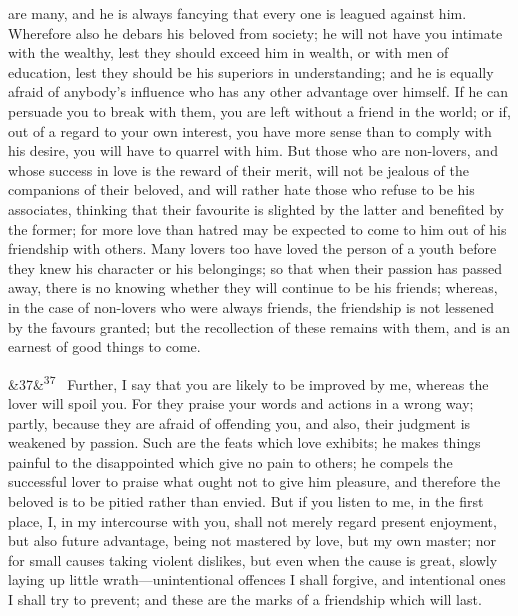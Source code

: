 \documentclass[12pt]{article}
\newcommand{\para}[1][]{\par\noindent\ifx&#1&\else\textsuperscript{\footnotesize #1}~\fi}
\begin{document}
are many, and he is always fancying that every one is leagued against him. Wherefore also he debars his beloved from society; he will not have you intimate with the wealthy, lest they should exceed him in wealth, or with men of education, lest they should be his superiors in understanding; and he is equally afraid of anybody's influence who has any other advantage over himself. If he can persuade you to break with them, you are left without a friend in the world; or if, out of a regard to your own interest, you have more sense than to comply with his desire, you will have to quarrel with him. But those who are non-lovers, and whose success in love is the reward of their merit, will not be jealous of the companions of their beloved, and will rather hate those who refuse to be his associates, thinking that their favourite is slighted by the latter and benefited by the former; for more love than hatred may be expected to come to him out of his friendship with others. Many lovers too have loved the person of a youth before they knew his character or his belongings; so that when their passion has passed away, there is no knowing whether they will continue to be his friends; whereas, in the case of non-lovers who were always friends, the friendship is not lessened by the favours granted; but the recollection of these remains with them, and is an earnest of good things to come.

\para[37] Further, I say that you are likely to be improved by me, whereas the lover will spoil you. For they praise your words and actions in a wrong way; partly, because they are afraid of offending you, and also, their judgment is weakened by passion. Such are the feats which love exhibits; he makes things painful to the disappointed which give no pain to others; he compels the successful lover to praise what ought not to give him pleasure, and therefore the beloved is to be pitied rather than envied. But if you listen to me, in the first place, I, in my intercourse with you, shall not merely regard present enjoyment, but also future advantage, being not mastered by love, but my own master; nor for small causes taking violent dislikes, but even when the cause is great, slowly laying up little wrath---unintentional offences I shall forgive, and intentional ones I shall try to prevent; and these are the marks of a friendship which will last.
\end{document}
